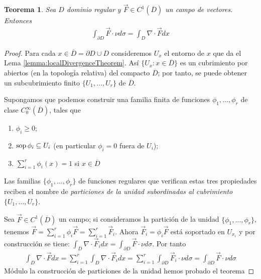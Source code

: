 \documentclass{report}
\newtheorem{theorem}{Teorema}
\theoremstyle{definition}
\theoremstyle{remark}
\DeclareMathOperator{\support}{\textnormal{sop}}
\begin{document}
  \begin{theorem}
    Sea \(D\) dominio regular y \(\vec{F} \in C^1\left(\overline{D}\right)\) un campo de vectores.
    Entonces
    \begin{align}
      \int_{\partial D} \vec{F} \cdot \nu d \sigma
      =
      \int_D \nabla \cdot \vec{F} dx
    \end{align}
  \end{theorem}
  \begin{proof}
    Para cada \(x \in \overline{D} = \partial D \cup D\) consideremos \(U_x\) el entorno de \(x\) que da el Lema \ref{lemma:localDivergenceTheorem}.
    Así \(\{U_x : x \in \overline{D}\}\) es un cubrimiento por abiertos (en la topología relativa) del compacto \(\overline{D}\);
    por tanto, se puede obtener un subcubrimiento finito \(\{U_1, \dots, U_r\}\) de \(\overline{D}\).

    Supongamos que podemos construir una familia finita de funciones \(\phi_1, \dots, \phi_r\) de clase \(C^{\infty}_0(\overline{D})\), tales que
    \begin{enumerate}
      \item \(\phi_i \geq 0\);
      \item \(\support \phi_i \subseteq U_i\) (en particular \(\phi_i = 0\) fuera de \(U_i\));
      \item \(\sum_{i = 1}^r \phi_i(x) = 1\) si \(x \in \overline{D}\)
    \end{enumerate}
    Las familias \(\{\phi_1, \dots, \phi_r\}\) de funciones regulares que verifican estas tres propiedades reciben el nombre de \emph{particiones de la unidad subordinadas al cubrimiento} \(\{U_1, \dots, U_r\}\).

    Sea \(\vec{F} \in C^1(\overline{D})\) un campo;
    si consideramos la partición de la unidad \(\{\phi_1, \dots, \phi_r\}\), tenemos
    \(
      \vec{F}
      =
      \sum_{i = 1}^r \phi_i \vec{F}
      =
      \sum_{i = 1}^r \vec{F}_i
    \).
    Ahora \(\vec{F}_i = \phi_i \vec{F}\) está soportado en \(U_{x_i}\) y por construcción se tiene:
    \(
      \int_D \nabla \cdot \vec{F}_i dx
      =
      \int_{\partial D} \vec{F} \cdot \nu d \sigma
    \).
    Por tanto
    \begin{align}
      \int_D \nabla \cdot \vec{F} dx
      =
      \sum_{i = 1}^r \int_D \nabla \cdot \vec{F}_i dx
      =
      \sum_{i = 1}^r \int_{\partial D} \vec{F}_i \cdot \nu d \sigma
      =
      \int_{\partial D} \vec{F} \cdot \nu d \sigma
    \end{align}
    Módulo la construcción de particiones de la unidad hemos probado el teorema
  \end{proof}
\end{document}
